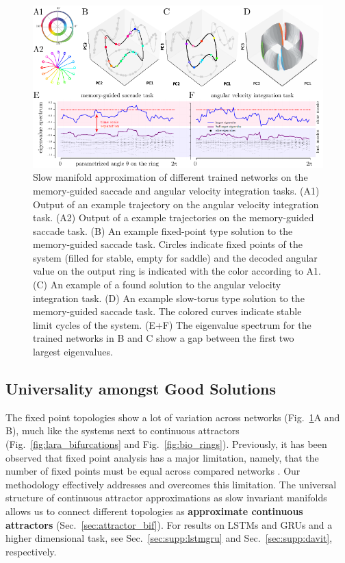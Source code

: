\documentclass{article} %
\newcounter{ct}
\theoremstyle{definition}
\theoremstyle{remark}
\begin{document}
\begin{figure}[tbhp]
  \centering
  \includegraphics[width=.95\textwidth]{fastslow_decomposition_normhyp_s}
  \caption{Slow manifold approximation of different trained networks on the memory-guided saccade and angular velocity integration tasks.
 (A1) Output of an example trajectory on the angular velocity integration task.
 (A2) Output of a example trajectories on the memory-guided saccade task.
 (B) An example fixed-point type solution to the memory-guided saccade task. Circles indicate fixed points of the system (filled for stable, empty for saddle) and the decoded angular value on the output ring is indicated with the color according to A1.
 (C) An example of a found solution to the angular velocity integration task.
 (D) An example slow-torus type solution to the memory-guided saccade task. The colored curves indicate stable limit cycles of the system.
 (E+F) The eigenvalue spectrum for the trained networks in B and C show a gap between the first two largest eigenvalues.
}\label{fig:fastslow_decomposition}
\end{figure}

\vspace{-.8cm}

\subsection{Universality amongst Good Solutions}
The fixed point topologies show a lot of variation across networks (Fig.~\ref{fig:fastslow_decomposition}A and B),
 much like the systems next to continuous attractors (Fig.~\ref{fig:lara_bifurcations} and Fig.~\ref{fig:bio_rings}).
Previously, it has been observed that fixed point analysis has a major limitation, namely, that the number of fixed points must be equal across compared networks  \citep{maheswaranathan2019universality}.
Our methodology effectively addresses and overcomes this limitation.
The universal structure of continuous attractor approximations as slow invariant manifolds allows us to connect different topologies as \textbf{approximate continuous attractors} (Sec.~\ref{sec:attractor_bif}).
For results on LSTMs and GRUs and a higher dimensional task, see Sec.~\ref{sec:supp:lstmgru} and  Sec.~\ref{sec:supp:davit}, respectively.
\end{document}
